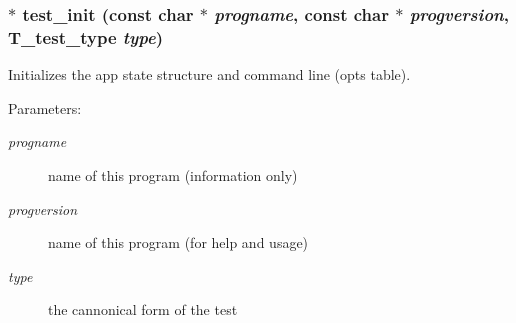 \subsubsection{$\ast$ test\_\-init (const char $\ast$ {\em progname}, const char $\ast$ {\em progversion}, {\bf T\_\-test\_\-type} {\em type})}\label{group__test_a0}


Initializes the app state structure and command line (opts table).

\begin{Desc}
\item[Parameters: ]\par
\begin{description}
\item[{\em 
progname}]name of this program (information only) \item[{\em 
progversion}]name of this program (for help and usage) \item[{\em 
type}]the cannonical form of the test \end{description}
\end{Desc}

